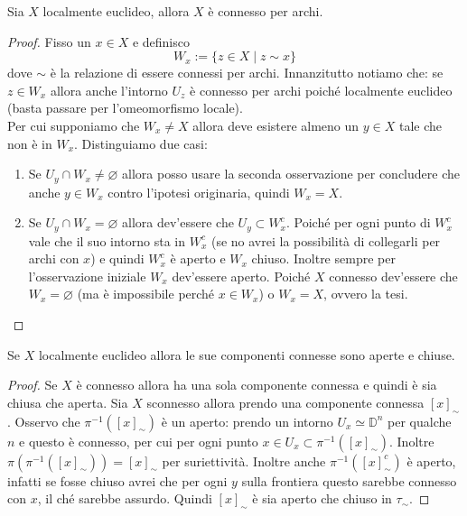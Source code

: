 \begin{theorem}
	Sia $X$ localmente euclideo, allora $X$ è connesso per archi. 
\end{theorem} 
\begin{proof}
	Fisso un $x \in X$ e definisco 
	\begin{equation}
	W_x := \{z \in X \;|\; z \sim x\}
	\end{equation}
	dove $\sim$ è la relazione di essere connessi per archi. Innanzitutto notiamo che: 
	se $z \in W_x$ allora anche l'intorno $U_z$ è connesso per archi poiché localmente euclideo (basta passare per l'omeomorfismo locale).\\
	
	Per cui supponiamo che $W_x \neq X$ allora deve esistere almeno un $y \in X$ tale che non è in $W_x$. Distinguiamo due casi: 
	\begin{enumerate}
		\item Se $U_y \cap W_x \neq \varnothing$ allora posso usare la seconda osservazione per concludere che anche $y \in W_x$ contro l'ipotesi originaria, quindi $W_x = X$.
		\item Se $U_y \cap W_x = \varnothing$ allora dev'essere che $U_y \subset W^c_x$. Poiché per ogni punto di $W^c_x$ vale che il suo intorno sta in $W^c_x$ (se no avrei la possibilità di collegarli per archi con $x$) e quindi $W^c_x$ è aperto e $W_x$ chiuso. Inoltre sempre per l'osservazione iniziale $W_x$ dev'essere aperto. Poiché $X$ connesso dev'essere che $W_x = \varnothing$ (ma è impossibile perché $x\in W_x$) o $W_x = X$, ovvero la tesi. 
	\end{enumerate}
\end{proof}


\begin{theorem}
	Se $X$ localmente euclideo allora le sue componenti connesse sono aperte e chiuse.
\end{theorem}
\begin{proof}
	Se $X$ è connesso allora ha una sola componente connessa e quindi è sia chiusa che aperta.
	Sia $X$ sconnesso allora prendo una componente connessa $\left[x\right]_\sim$. Osservo che $\pi^{-1}(\left[x\right]_\sim)$ è un aperto: prendo un intorno $U_x \simeq \mathbb{D}^n$ per qualche $n$ e questo è connesso, per cui per ogni punto $x \in U_x \subset \pi^{-1}(\left[x\right]_\sim)$. Inoltre $\pi(\pi^{-1}(\left[x\right]_\sim)) = \left[x\right]_\sim$ per suriettività. Inoltre anche $\pi^{-1}(\left[x\right]^c_\sim)$ è aperto, infatti se fosse chiuso avrei che per ogni $y$ sulla frontiera questo sarebbe connesso con $x$, il ché sarebbe assurdo. Quindi $\left[x\right]_\sim$ è sia aperto che chiuso in $\tau_\sim$.
\end{proof}

